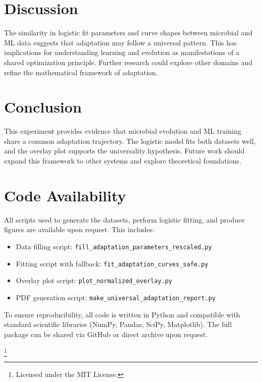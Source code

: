 \documentclass[11pt]{article}
\begin{document}
	\section{Discussion}
	The similarity in logistic fit parameters and curve shapes between microbial and ML data suggests that adaptation may follow a universal pattern. This has implications for understanding learning and evolution as manifestations of a shared optimization principle. Further research could explore other domains and refine the mathematical framework of adaptation.
	
	\section{Conclusion}
	This experiment provides evidence that microbial evolution and ML training share a common adaptation trajectory. The logistic model fits both datasets well, and the overlay plot supports the universality hypothesis. Future work should expand this framework to other systems and explore theoretical foundations.
	
	
	\section*{Code Availability}
	
	All scripts used to generate the datasets, perform logistic fitting, and produce figures are available upon request. This includes:
	
	\begin{itemize}
		\item Data filling script: \texttt{fill\_adaptation\_parameters\_rescaled.py}
		\item Fitting script with fallback: \texttt{fit\_adaptation\_curves\_safe.py}
		\item Overlay plot script: \texttt{plot\_normalized\_overlay.py}
		\item PDF generation script: \texttt{make\_universal\_adaptation\_report.py}
	\end{itemize}
	


	
	To ensure reproducibility, all code is written in Python and compatible with standard scientific libraries (NumPy, Pandas, SciPy, Matplotlib). The full package can be shared via GitHub or direct archive upon request.
	

	
	
	
	\footnote{Licensed under the MIT License.}
	
	
\end{document}
